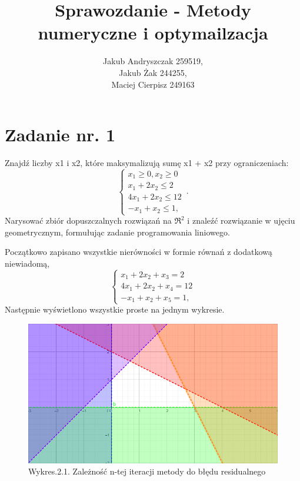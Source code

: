 \documentclass{article}
\begin{document}
\title{Sprawozdanie - Metody numeryczne i optymailzacja}
\author{Jakub Andryszczak 259519,\\ Jakub Żak 244255,\\ Maciej Cierpisz 249163}
\date{}
\maketitle

\newpage
\tableofcontents

\newpage
\section{Zadanie nr. 1}
Znajdź liczby x1 i x2, które maksymalizują sumę x1 + x2 przy ograniczeniach:
\begin{equation}
    \begin{cases}
      x_{1} \geq 0,x_{2}\geq 0 \\
     x_{1}+2x_{2} \leq 2 \\
     4x_{1} + 2x_{2}\leq 12\\
     -x_1 + x_2 \leq 1, 
    \end{cases}\,.
  \end{equation}
  Narysować zbiór dopuszczalnych rozwiązań na $\Re^2$ i znaleźć rozwiązanie w ujęciu
geometrycznym, formułując zadanie programowania liniowego.
\newline

Początkowo zapisano wszystkie nierówności w formie równań z dodatkową niewiadomą,
\begin{equation}
    \begin{cases}
      x_{1}+2x_{2}+x_3 = 2 \\
     4x_{1} + 2x_{2}+x_4 = 12\\
     -x_1 + x_2 + x_5 = 1, 
    \end{cases}
  \end{equation}
Następnie wyświetlono wszystkie proste na jednym wykresie.
\begin{figure}[h]
    \includegraphics[scale=0.7]{Simplex1.png}
    \centering
    \captionsetup[Tabela]{name=New Table Name}
    \caption*{Wykres.2.1. Zależność n-tej iteracji metody do błędu residualnego}
  \end{figure}
\end{document}
